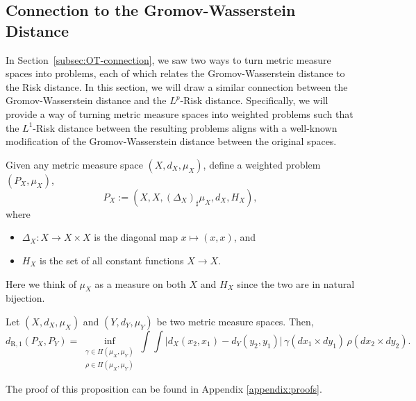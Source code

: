\documentclass[twoside,11pt]{article}
\newcommand{\dexp}[1][]{d_{\mathrm{R}#1}}
\begin{document}
\subsection{Connection to the Gromov-Wasserstein Distance}\label{subsec:OT-connection-weighted}

In Section~\ref{subsec:OT-connection}, we saw two ways to turn metric measure spaces into problems, each of which relates the Gromov-Wasserstein distance to the Risk distance. In this section, we will draw a similar connection between the Gromov-Wasserstein distance and the $L^p$-Risk distance. Specifically, we will provide a way of turning metric measure spaces into weighted problems such that the $L^1$-Risk distance between the resulting problems aligns with a well-known modification of the Gromov-Wasserstein distance between the original spaces. 

Given any metric measure space $(X,d_X,\mu_X)$, define a weighted problem $(P_X, \mu_X)$,
\[P_X := (X, X, (\Delta_X)_\sharp \mu_X, d_X, H_X),\]
where
\begin{itemize}
    \item $\Delta_X:X\to X\times X$ is the diagonal map $x\mapsto (x,x)$, and
    \item $H_X$ is the set of all constant functions $X\to X$.
\end{itemize}



Here we think of $\mu_X$ as a measure on both $X$ and $H_X$ since the two are in natural bijection.


\begin{proposition} \label{prop:conn-w-dGW}
Let $(X,d_X,\mu_X)$ and $(Y,d_Y,\mu_Y)$ be two metric measure spaces. Then, 
\begin{equation}\dexp[,1](P_X,P_Y)=\inf_{\substack{\gamma \in \Pi(\mu_X, \mu_Y)\\
    \rho \in  \Pi(\mu_X, \mu_Y)}}
    \int \int \big | d_X(x_2,x_1) - d_Y(y_2,y_1) \big| \, \gamma(dx_1{\times}dy_1)\,\rho(dx_2{\times}dy_2)\tag{$\star$}\label{expression:bilinear}.\end{equation}
\end{proposition}
The proof of this proposition can be found in Appendix \ref{appendix:proofs}.
\end{document}
